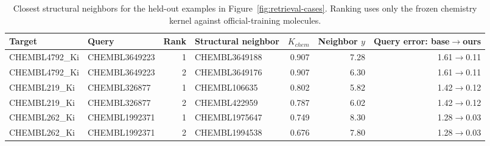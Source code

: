 \begin{table}[t]
\centering
\caption{Closest structural neighbors for the held-out examples in Figure~\ref{fig:retrieval-cases}. Ranking uses only the frozen chemistry kernel against official-training molecules.}
\label{tab:retrieval-cases}
\small
\begin{tabular}{llrlrrr}
\toprule
Target & Query & Rank & Structural neighbor & $K_{chem}$ & Neighbor $y$ & Query error: base$\to$ours\\
\midrule
CHEMBL4792\_Ki & CHEMBL3649223 & 1 & CHEMBL3649188 & 0.907 & 7.28 & 1.61$\to$0.11\\
CHEMBL4792\_Ki & CHEMBL3649223 & 2 & CHEMBL3649176 & 0.907 & 6.30 & 1.61$\to$0.11\\
CHEMBL219\_Ki & CHEMBL326877 & 1 & CHEMBL106635 & 0.802 & 5.82 & 1.42$\to$0.12\\
CHEMBL219\_Ki & CHEMBL326877 & 2 & CHEMBL422959 & 0.787 & 6.02 & 1.42$\to$0.12\\
CHEMBL262\_Ki & CHEMBL1992371 & 1 & CHEMBL1975647 & 0.749 & 8.30 & 1.28$\to$0.03\\
CHEMBL262\_Ki & CHEMBL1992371 & 2 & CHEMBL1994538 & 0.676 & 7.80 & 1.28$\to$0.03\\
\bottomrule
\end{tabular}
\end{table}

